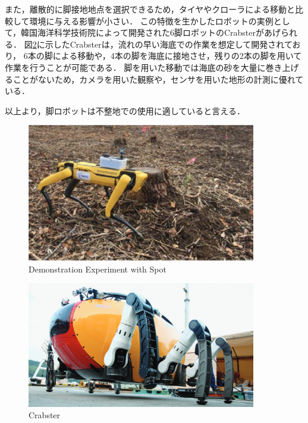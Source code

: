 また，離散的に脚接地地点を選択できるため，タイヤやクローラによる移動と比較して環境に与える影響が小さい．
この特徴を生かしたロボットの実例として，韓国海洋科学技術院によって開発された6脚ロボットのCrabster\cite{J_Kim_Dexterous_Crabster}があげられる．
図\ref{fig:crabster}に示したCrabsterは，流れの早い海底での作業を想定して開発されており，
6本の脚による移動や，4本の脚を海底に接地させ，残りの2本の脚を用いて作業を行うことが可能である．
脚を用いた移動では海底の砂を大量に巻き上げることがないため\cite{J_Kim_Little_Crabster}，カメラを用いた観察や，センサを用いた地形の計測に優れている．

以上より，脚ロボットは不整地での使用に適していると言える．

\begin{figure}[htbp]
  \begin{center}
    \includegraphics[width=100mm, clip]{figure/chapter1/NEDO.png}
   \caption{Demonstration Experiment with Spot\cite{NEDO}}
   \label{fig:nedo_spot}
  \end{center}
\end{figure}

\begin{figure}[htbp]
  \begin{center}
    \includegraphics[width=100mm, clip]{figure/chapter1/crabster.png}
   \caption{Crabster\cite{J_Kim_Dexterous_Crabster}}
   \label{fig:crabster}
  \end{center}
\end{figure}

